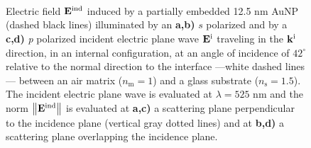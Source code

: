 \begin{figure}[h!]\centering
   \def\svgwidth{.75\textwidth}
   \footnotesize
   \\[-32.6em]
   \hspace*{-.25\textwidth}
       \begin{subfigure}{.25\textwidth}\textcolor{red}{\caption{ } \label{sfig:Near:Inc0:42:s1}}\end{subfigure}%
       \begin{subfigure}{.34\textwidth}\caption{ }\label{sfig:Near:Inc0:42:s2}\end{subfigure}\\[13em]
    \hspace*{-.25\textwidth}
       \begin{subfigure}{.25\textwidth}\textcolor{red}{\caption{ } \label{sfig:Near:Inc0:42:p1}}\end{subfigure}%
       \begin{subfigure}{.34\textwidth}\caption{ }\label{sfig:Near:Inc0:42:p2}\end{subfigure}\\[15em]
   \caption[Induced Electric Field of a 12.5 nm Au NP on substrate illuminated at oblique incidence with a $s$ polarized electric field]{%
   Electric field $\vb{E}^\text{ind}$ induced by a partially embedded 12.5 nm AuNP (dashed black lines) illuminated by an \textbf{a,b)} $s$ polarized and  by a \textbf{c,d)} \textit{p} polarized incident electric plane wave $\vb{E}^\text{i}$ traveling in the $\vb{k}^\text{i}$ direction, in an internal configuration, at an angle of incidence of  $42^\circ$ relative to the normal direction to the interface ---white dashed lines--- between an air matrix ($n_\text{m} = 1$) and a glass substrate ($n_\text{s} = 1.5$). The incident electric plane wave is evaluated at $\lambda = 525$ nm and the norm $\norm{\vb{E}^\text{ind}}$ is evaluated at  \textbf{a,c)} a scattering plane perpendicular to the incidence plane (vertical gray dotted lines) and at \textbf{b,d)} a scattering plane overlapping the incidence plane. }
   \label{fig:Near:Inc0:42}
 \end{figure}
